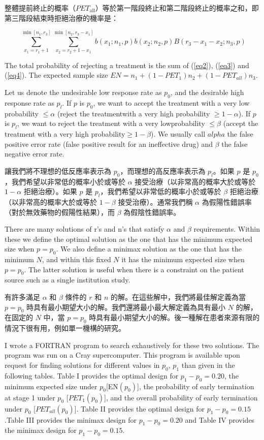 整體提前終止的概率（$PET_{\text{all}}$）等於第一階段終止和第二階段終止的概率之和，即第三階段結束時拒絕治療的機率是：

\begin{equation}
\ \sum_{x_1=r_1+1}^{\min[n_1,r_3]}\sum_{x_2=r_2+1-x_1}^{\min[n_2,r_3-x_1]} b(x_1;n_1,p)b(x_2;n_2,p)B(r_3-x_1-x_2;n_3,p) \label{eq4}
\end{equation}

The total probability of rejecting a treatment is the sum of (\ref{eq2}), (\ref{eq3}) and (\ref{eq4}). The expected sample size $EN=n_1+(1-PET_1)n_2+(1-PET_{all}) n_3$.

Let us denote the undesirable low response rate as $p_0$, and the desirable high response rate as $p_l$. If $p$ is $p_0$, we want to accept the treatment with a very low probability $\leq \alpha$ (reject the treatmentwith a very high probability $\geq 1-\alpha$). If $p$ is $p_l$, we want to reject the treatment with a very lowprobability $\leq \beta$ (accept the treatment with a very high probability$\geq 1-\beta$). We usually call $alpha$ the false positive error rate (false positive result for an ineffective drug) and $\beta$ the false negative error rate.

讓我們將不理想的低反應率表示為 $p_0$，而理想的高反應率表示為 $p_l$。如果 $p$ 是 $p_0$，我們希望以非常低的概率小於或等於 $\alpha$ 接受治療（以非常高的概率大於或等於 $1-\alpha$ 拒絕治療）。如果 $p$ 是 $p_l$，我們希望以非常低的概率小於或等於 $\beta$ 拒絕治療（以非常高的概率大於或等於 $1-\beta$ 接受治療）。通常我們稱 $\alpha$ 為假陽性錯誤率（對於無效藥物的假陽性結果），而 $\beta$ 為假陰性錯誤率。

There are many solutions of r’s and n’s that satisfy $\alpha$ and $\beta$ requirements. Within these we define the optimal solution as the one that has the minimum expected size when $p =p_0$. We also define a minimax solution as the one that has the minimum $N$, and within this fixed $N$ it has the minimum expected size when $p=p_0$. The latter solution is useful when there is a constraint on the patient source such as a single institution study.

有許多滿足 $\alpha$ 和 $\beta$ 條件的 $r$ 和 $n$ 的解。在這些解中，我們將最佳解定義為當 $p = p_0$ 時具有最小期望大小的解。我們還將最小最大解定義為具有最小 $N$ 的解，在固定的 $N$ 中，當 $p = p_0$ 時具有最小期望大小的解。後一種解在患者來源有限的情況下很有用，例如單一機構的研究。

I wrote a FORTRAN program to search exhaustively for these two solutions. The program was run on a Cray supercomputer. This program is available upon request for finding solutions for different values in $p_0$, $p_1$ than given in the following tables. Table I provides the optimal design for $p_1-p_0=0.20$, the minimum expected size under $p_0$[EN$(p_0)$], the probability of early termination at stage 1 under $p_0$ [$PET_1(p_0)$], and the overall probability of early termination under $p_0$ [$PET_{all}(p_0)$]. Table II provides the optimal design for $p_1-p_0=0.15$.Table III provides the minimax design for $p_1-p_0=0.20$ and Table IV provides the minimax design for $p_1-p_0=0.15$.

